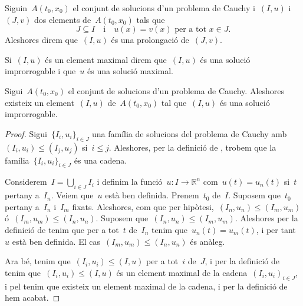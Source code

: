 \documentclass[../../main.tex]{subfiles}
\begin{document}
    \begin{definition}[Prolongació]
        \label{def:prolongació}
        \label{def:solució improrrogable}
        \label{def:solució maximal}
        Siguin~\(A(t_{0},x_{0})\) el conjunt de solucions d'un problema de Cauchy i~\((I,u)\) i~\((J,v)\) dos elements de~\(A(t_{0},x_{0})\) tals que
        \[
            J\subseteq I\quad\text{i}\quad u(x)=v(x)\text{ per a tot }x\in J.
        \]
        Aleshores direm que~\((I,u)\) és una prolongació de~\((J,v)\).

        Si~\((I,u)\) és un element maximal direm que~\((I,u)\) és una solució improrrogable i que~\(u\) és una solució maximal.
    \end{definition}
    \begin{proposition}
        \label{prop:existeixen solucions improrrogables}
        Sigui~\(A(t_{0},x_{0})\) el conjunt de solucions d'un problema de Cauchy.
        Aleshores existeix un element~\((I,u)\) de~\(A(t_{0},x_{0})\) tal que~\((I,u)\) és una solució improrrogable.
        \begin{proof}
            Sigui~\(\{I_{i},u_{i}\}_{i\in J}\) una família de solucions del problema de Cauchy amb~\((I_{i},u_{i})\leq(I_{j},u_{j})\) si~\(i\leq j\).
            Aleshores, per la definició de , trobem que la família~\(\{I_{i},u_{i}\}_{i\in J}\) és una cadena.

            Considerem~\(I=\bigcup_{i\in J}I_{i}\) i definim la funció~\(u\colon I\longrightarrow\mathbb{R}^{n}\) com~\(u(t)=u_{n}(t)\) si~\(t\) pertany a~\(I_{n}\).
            Veiem que~\(u\) està ben definida.
            Prenem~\(t_{0}\) de~\(I\).
            Suposem que~\(t_{0}\) pertany a~\(I_{n}\) i~\(I_{m}\) fixats.
            Aleshores, com que per hipòtesi,~\((I_{n},u_{n})\leq(I_{m},u_{m})\) ó~\((I_{m},u_{m})\leq(I_{n},u_{n})\).
            Suposem que~\((I_{n},u_{n})\leq(I_{m},u_{m})\).
            Aleshores per la definició de  tenim que per a tot~\(t\) de~\(I_{n}\) tenim que~\(u_{n}(t)=u_{m}(t)\), i per tant~\(u\) està ben definida.
            El cas~\((I_{m},u_{m})\leq(I_{n},u_{n})\) és anàleg.

            Ara bé, tenim que~\((I_{i},u_{i})\leq(I,u)\) per a tot~\(i\) de~\(J\), i per la definició de  tenim que~\((I_{i},u_{i})\leq(I,u)\) és un element maximal de la cadena~\((I_{i},u_{i})_{i\in J}\), i pel  tenim que existeix un element maximal de la cadena, i per la definició de  hem acabat.
        \end{proof}
    \end{proposition}
\end{document}
